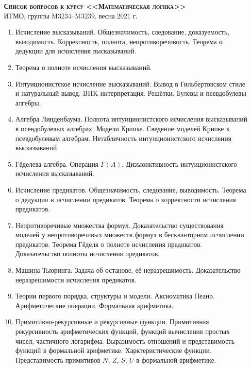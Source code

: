 \documentclass[11pt,a4paper,oneside]{scrartcl}
\begin{document}
\pagestyle{empty}

\begin{center}
{\large\scshape\bfseries Список вопросов к курсу <<Математическая логика>>}\\
ИТМО, группы M3234--M3239, весна 2021 г.
\end{center}


\begin{enumerate}
\item Исчисление высказываний. Общезначимость, следование, доказуемость, выводимость. Корректность, полнота, непротиворечивость.
Теорема о дедукции для исчисления высказываний. 
\item Теорема о полноте исчисления высказываний.
\item Интуиционистское исчисление высказываний. Вывод в Гильбертовском стиле и натуральный вывод.
BHK-интерпретация. Решётки. Булевы и псевдобулевы алгебры.
\item Алгебра Линденбаума. Полнота интуиционистского исчисления высказываний в псевдобулевых алгебрах.
Модели Крипке. Сведение моделей Крипке к псевдобулевым алгебрам. Нетабличность 
интуиционистского исчисления высказываний.
\item Гёделева алгебра. Операция $\Gamma(A)$. Дизъюнктивность интуиционистского исчисления высказываний.
\item Исчисление предикатов. Общезначимость, следование, выводимость. Теорема о дедукции в исчислении предикатов.
Теорема о корректности исчисления предикатов.
\item Непротиворечивые множества формул. Доказательство существования моделей у непротиворечивых множеств формул 
в бескванторном исчислении предикатов.
Теорема Гёделя о полноте исчисления предикатов. Доказательство полноты исчисления предикатов.
\item Машина Тьюринга. Задача об останове, её неразрешимость. Доказательство неразрешимости исчисления предикатов.
\item Теории первого порядка, структуры и модели. Аксиоматика Пеано. Арифметические операции. Формальная арифметика. 
\item Примитивно-рекурсивные и рекурсивные функции. Примитивная рекурсивность 
арифметических функций, функций вычисления простых чисел, частичного логарифма.
Выразимость отношений и представимость функций в формальной арифметике. Харктеристические функции.
Представимость примитивов $N$, $Z$, $S$, $U$ в формальной арифметике.

\end{enumerate}
\end{document}
